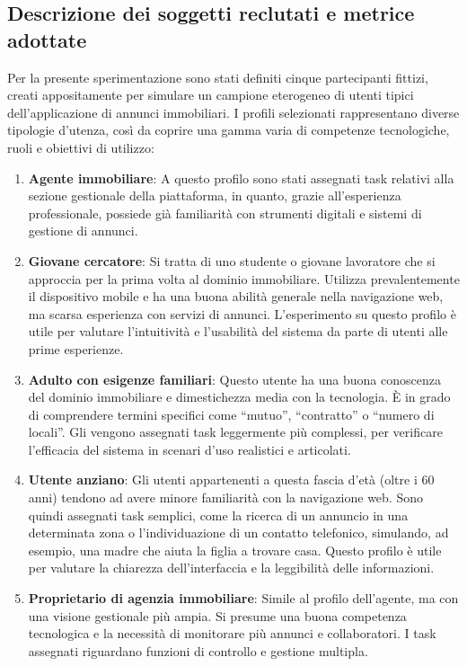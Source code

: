 \subsection{Descrizione dei soggetti reclutati e metrice adottate}

Per la presente sperimentazione sono stati definiti cinque partecipanti fittizi, creati appositamente per simulare un campione eterogeneo di utenti tipici dell’applicazione di annunci immobiliari.
I profili selezionati rappresentano diverse tipologie d’utenza, così da coprire una gamma varia di competenze tecnologiche, ruoli e obiettivi di utilizzo:

\begin{enumerate}
	
	\item \textbf{Agente immobiliare}: A questo profilo sono stati assegnati task relativi alla sezione gestionale della piattaforma, in quanto, grazie all’esperienza professionale, possiede già familiarità con strumenti digitali e sistemi di gestione di annunci.
	
	\item \textbf{Giovane cercatore}: Si tratta di uno studente o giovane lavoratore che si approccia per la prima volta al dominio immobiliare. Utilizza prevalentemente il dispositivo mobile e ha una buona abilità generale nella navigazione web, ma scarsa esperienza con servizi di annunci. L’esperimento su questo profilo è utile per valutare l’intuitività e l’usabilità del sistema da parte di utenti alle prime esperienze.
	
	
	\item \textbf{Adulto con esigenze familiari}: Questo utente ha una buona conoscenza del dominio immobiliare e dimestichezza media con la tecnologia. È in grado di comprendere termini specifici come “mutuo”, “contratto” o “numero di locali”. Gli vengono assegnati task leggermente più complessi, per verificare l’efficacia del sistema in scenari d’uso realistici e articolati.
	
	\item \textbf{Utente anziano}: Gli utenti appartenenti a questa fascia d’età (oltre i 60 anni) tendono ad avere minore familiarità con la navigazione web. Sono quindi assegnati task semplici, come la ricerca di un annuncio in una determinata zona o l’individuazione di un contatto telefonico, simulando, ad esempio, una madre che aiuta la figlia a trovare casa. Questo profilo è utile per valutare la chiarezza dell’interfaccia e la leggibilità delle informazioni.
	
	\item \textbf{Proprietario di agenzia immobiliare}: Simile al profilo dell’agente, ma con una visione gestionale più ampia. Si presume una buona competenza tecnologica e la necessità di monitorare più annunci e collaboratori. I task assegnati riguardano funzioni di controllo e gestione multipla.
	
\end{enumerate}

